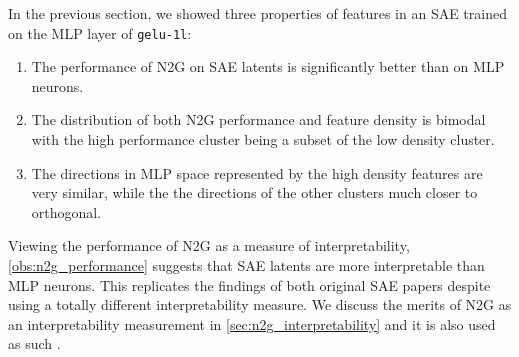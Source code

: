 In the previous section, we showed three properties of features in an SAE trained on the MLP layer of \texttt{gelu-1l}: 
\begin{enumerate}[ref={observation~\arabic*}]
    \item The performance of N2G on SAE latents is significantly better than on MLP neurons.\label{obs:n2g_performance}
    \item The distribution of both N2G performance and feature density is bimodal with the high performance cluster being a subset of the low density cluster.\label{obs:bimodal}
    \item The directions in MLP space represented by the high density features are very similar, while the the directions of the other clusters much closer to orthogonal.\label{obs:directions}
\end{enumerate}
Viewing the performance of N2G as a measure of interpretability, \ref{obs:n2g_performance} suggests that SAE latents are more interpretable than MLP neurons.
This replicates the findings of both original SAE papers \parencite{bricken_towards_2023}\parencite{cunningham_sparse_2023} despite using a totally different interpretability measure.
We discuss the merits of N2G as an interpretability measurement in \autoref{sec:n2g_interpretability} and it is also used as such \textcite{gao_scaling_2024}.

